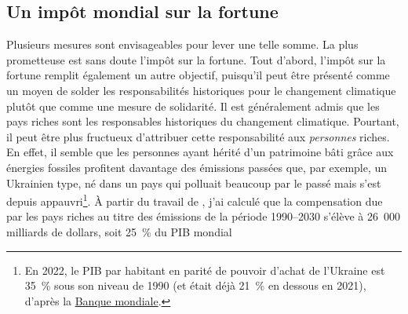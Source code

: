 \documentclass[a5paper,french,openany]{memoir}
\begin{document}
\subsection{Un impôt mondial sur la fortune} %
Plusieurs mesures sont envisageables pour lever une telle somme. La plus prometteuse est sans doute l'impôt sur la fortune. Tout d'abord, l'impôt sur la fortune remplit également un autre objectif, puisqu'il peut être présenté comme un moyen de solder 
les responsabilités historiques pour le changement climatique plutôt que comme une mesure de solidarité. Il est généralement admis que les pays riches sont les responsables historiques du changement climatique. Pourtant, il peut être plus fructueux d'attribuer cette responsabilité aux \textit{personnes} riches. En effet, il semble que les personnes ayant hérité d'un patrimoine bâti grâce aux énergies fossiles profitent davantage des émissions passées que, par exemple, un Ukrainien type, né dans un pays qui polluait beaucoup par le passé mais s'est depuis appauvri\footnote{En 2022, le PIB par habitant en parité de pouvoir d'achat de l'Ukraine est 35~\% sous son niveau de 1990 (et était déjà 21~\% en dessous en 2021), d'après la \href{https://data.worldbank.org/indicator/NY.GDP.PCAP.PP.KD?locations=UA}{Banque mondiale}.}. %
À partir du travail de \cite{fanning_compensation_2023}, j'ai calculé que la compensation due par les pays riches au titre des émissions de la période 1990--2030 s'élève à 26~000 milliards de dollars, soit 25~\% du PIB mondial
\end{document}
